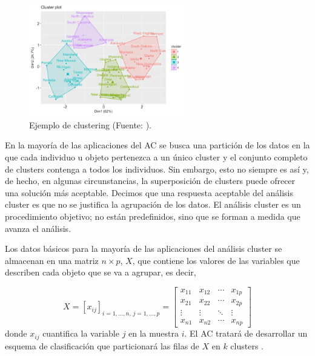 \begin{figure}[h]
    \centering
    \includegraphics[width=0.6\textwidth]{../img/cluster-1.png}
    \caption{Ejemplo de clustering (Fuente: \cite{img-cluster-1}).}
\end{figure}

En la mayoría de las aplicaciones del AC se busca una partición de los datos en la que cada individuo u objeto pertenezca a un único cluster y el conjunto completo de clusters
contenga a todos los individuos. Sin embargo, esto no siempre es así y, de hecho, en algunas circunstancias, la superposición de clusters puede ofrecer una solución más aceptable.
Decimos que una respuesta aceptable del análisis cluster es que no se justifica la agrupación de los datos. El análisis cluster es un procedimiento objetivo; no están predefinidos,
sino que se forman a medida que avanza el análisis. \newline

Los datos básicos para la mayoría de las aplicaciones del análisis cluster se almacenan en una matriz $n \times p$, $X$, que contiene los valores de las variables que describen
cada objeto que se va a agrupar, es decir,

\[
X = [x_{ij}]_{i=1,\dots,n,\, j=1,\dots,p} =
\begin{bmatrix}
x_{11} & x_{12} & \cdots & x_{1p} \\
x_{21} & x_{22} & \cdots & x_{2p} \\
\vdots & \vdots & \ddots & \vdots \\
x_{n1} & x_{n2} & \cdots & x_{np}
\end{bmatrix}
\]
donde $x_{ij}$ cuantifica la variable $j$ en la muestra $i$. El AC tratará de desarrollar un esquema de clasificación que particionará las filas de $X$ en $k$ clusters \cite{clustering-2}. %


